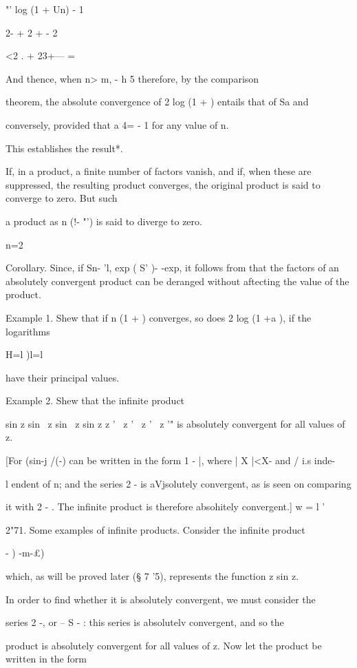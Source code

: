   "' log (1 + Un) - 1

2- + 2 +    - 2 

<2 . + 23+--- =

And thence, when n> m, - h 5 therefore, by the comparison

theorem, the absolute convergence of 2 log (1 + ) entails that of Sa
and

conversely, provided that a 4= - 1 for any value of n.

This establishes the result*.

If, in a product, a finite number of factors vanish, and if, when
these are suppressed, the resulting product converges, the original
product is said to converge to zero. But such

a product as n (!- "') is said to diverge to zero.

n=2

Corollary. Since, if Sn- 'l, exp ( S' )- -exp, it follows from
that the factors of an absolutely convergent product can be deranged
without aftecting the value of the product.

Example 1. Shew that if n (1 + ) converges, so does 2 log (1 +a ), if
the logarithms

H=l )l=l

have their principal values.

Example 2. Shew that the infinite product

sin z sin \ z sin \ z sin z z ' \ z ' \ z ' \ z '" is absolutely
convergent for all values of z.

[For (sin-j /(-) can be written in the form 1 - |, where | X |<X- and
/ i.s inde-

l endent of n; and the series 2 - is aVjsolutely convergent, as is
seen on comparing

it with 2 - . The infinite product is therefore absohitely
convergent.] w = l '

2"71. Some examples of infinite products. Consider the infinite
product

  - ) -m-£)

which, as will be proved later (§ 7 '5), represents the function z sin
z.

In order to find whether it is absolutely convergent, we must consider
the

series 2 -, or -- S - : this series is absolutelv convergent, and so
the

product is absolutely convergent for all values of z. Now let the
product be written in the form

